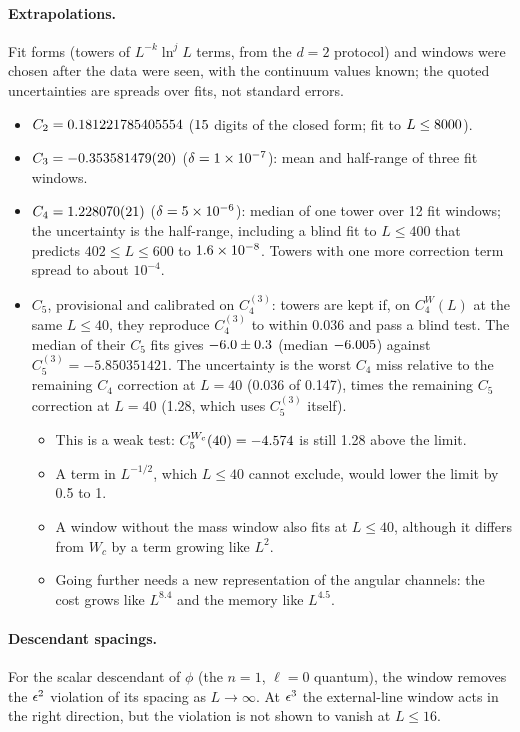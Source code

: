 \paragraph{Extrapolations.}
Fit forms (towers of $L^{-k}\ln^jL$ terms, from the $d=2$ protocol) and windows were chosen after the data were seen,
with the continuum values known; the quoted uncertainties are spreads over fits, not standard errors.
\begin{itemize}
\item $C_2=0.181221785405554$ ($15$ digits of the closed form; fit to $L\le8000$).
\item $C_3=-0.353581479(20)$ ($\delta=1\times10^{-7}$): mean and half-range of three fit windows.
\item $C_4=1.228070(21)$ ($\delta=5\times10^{-6}$): median of one tower over 12 fit windows; the uncertainty is
 the half-range, including a blind fit to $L\le400$ that predicts $402\le L\le600$ to $1.6\times10^{-8}$. Towers with
 one more correction term spread to about $10^{-4}$.
\item $C_5$, provisional and calibrated on $C_4^{(3)}$: towers are kept if, on $C_4^W(L)$ at the same $L\le40$, they
 reproduce $C_4^{(3)}$ to within 0.036 and pass a blind test. The median of their $C_5$ fits gives $-6.0\pm0.3$
 (median $-6.005$) against $C_5^{(3)}=-5.850351421$. The uncertainty is the worst $C_4$ miss relative to the
 remaining $C_4$ correction at $L=40$ (0.036 of 0.147), times the remaining $C_5$ correction at $L=40$ (1.28, which
 uses $C_5^{(3)}$ itself).
 \begin{itemize}
 \item This is a weak test: $C_5^{W_c}(40)=-4.574$ is still 1.28 above the limit.
 \item A term in $L^{-1/2}$, which $L\le40$ cannot exclude, would lower the limit by 0.5 to 1.
 \item A window without the mass window also fits at $L\le40$, although it differs from $W_c$ by a term growing like
  $L^2$.
 \item Going further needs a new representation of the angular channels: the cost grows like $L^{8.4}$ and the memory
  like $L^{4.5}$.
 \end{itemize}
\end{itemize}

\paragraph{Descendant spacings.}
For the scalar descendant of $\phi$ (the $n=1$, $\ell=0$ quantum), the window removes the $\epsilon^2$ violation of its
spacing as $L\to\infty$. At $\epsilon^3$ the external-line window acts in the right direction, but the violation is not shown
to vanish at $L\le16$.
